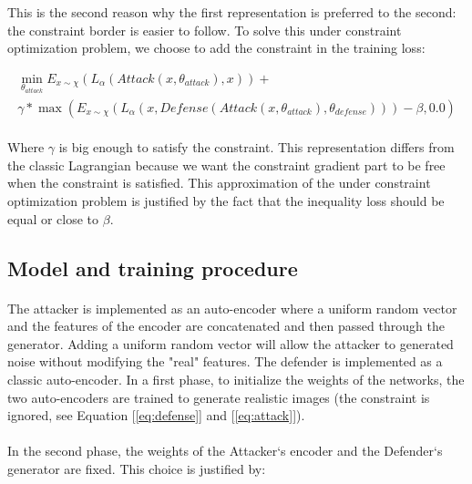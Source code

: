 \documentclass[12pt]{article}
\begin{document}
This is the second reason why the first representation is preferred to the second: the constraint border is easier to follow.
To solve this under constraint optimization problem, we choose to add the constraint in the training loss:

\begin{equation}\label{eq:loss}
\begin{multlined}
\min_{\theta_{attack}} E_{x \sim \chi}(L_{\alpha}(Attack(x, \theta_{attack}), x)) + \\ \gamma * \max( E_{x \sim \chi}(L_{\alpha}(x, Defense(Attack(x, \theta_{attack}), \theta_{defense}))) - \beta, 0.0)
\end{multlined}
\end{equation}

\paragraph{}
Where $\gamma$ is big enough to satisfy the constraint. This representation differs from the classic Lagrangian because we want the constraint gradient part to be free when the constraint is satisfied. This approximation of the under constraint optimization problem is justified by the fact that the inequality loss should be equal or close to $\beta$.

\subsection{Model and training procedure}
\paragraph{}
The attacker is implemented as an auto-encoder where a uniform random vector and the features of the encoder are concatenated and then passed through the generator. Adding a uniform random vector will allow the attacker to generated noise without modifying the "real" features. The defender is implemented as a classic auto-encoder. In a first phase, to initialize the weights of the networks, the two auto-encoders are trained to generate realistic images (the constraint is ignored, see Equation [\ref{eq:defense}] and [\ref{eq:attack}]).

\paragraph{}
In the second phase, the weights of the Attacker‘s encoder and the Defender‘s generator are fixed. This choice is justified by:
\end{document}
